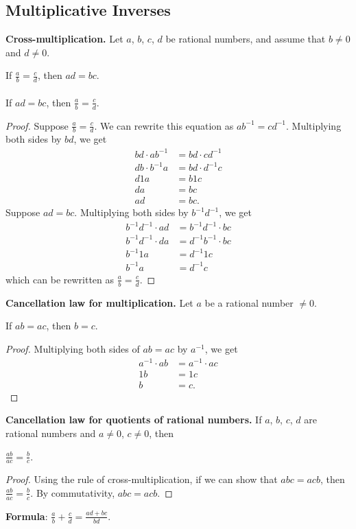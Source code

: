 \documentclass[12pt]{article}
\begin{document}
\subsection{Multiplicative Inverses}
\textbf{Cross-multiplication.} Let $a$, $b$, $c$, $d$ be rational numbers, and assume that $b\neq0$ and $d\neq0$.
\begin{center}
If $\displaystyle \frac{a}{b}=\displaystyle \frac{c}{d}$, then $ad=bc$. \\
~ \\
If $ad=bc$, then $\displaystyle \frac{a}{b}=\displaystyle \frac{c}{d}$.
\end{center}
\begin{proof}
Suppose $\displaystyle \frac{a}{b}=\displaystyle \frac{c}{d}$. We can rewrite this equation as $ab^{-1}=cd^{-1}$. Multiplying both sides by $bd$, we get
\begin{align*}
bd\cdot ab^{-1}&=bd\cdot cd^{-1} \\
db\cdot b^{-1}a&=bd\cdot d^{-1}c \\
d1a&=b1c \\
da&=bc \\
ad&=bc.
\end{align*}
Suppose $ad=bc$. Multiplying both sides by $b^{-1}d^{-1}$, we get
\begin{align*}
b^{-1}d^{-1}\cdot ad&=b^{-1}d^{-1}\cdot bc \\
b^{-1}d^{-1}\cdot da&=d^{-1}b^{-1}\cdot bc \\
b^{-1}1a&=d^{-1}1c \\
b^{-1}a&=d^{-1}c
\end{align*}
which can be rewritten as $\displaystyle \frac{a}{b}=\displaystyle \frac{c}{d}$.
\end{proof}
\textbf{Cancellation law for multiplication.} Let $a$ be a rational number $\neq0$.
\begin{center}
If $ab=ac$, then $b=c$.
\end{center}
\begin{proof}
Multiplying both sides of $ab=ac$ by $a^{-1}$, we get
\begin{align*}
a^{-1}\cdot ab&=a^{-1}\cdot ac \\
1b&=1c \\
b&=c.
\end{align*}
\end{proof}
\textbf{Cancellation law for quotients of rational numbers.} If $a$, $b$, $c$, $d$ are rational numbers and $a\neq0$, $c\neq0$, then
\begin{center}
$\displaystyle \frac{ab}{ac}=\displaystyle \frac{b}{c}$.
\end{center}
\begin{proof}
Using the rule of cross-multiplication, if we can show that $abc=acb$, then $\displaystyle \frac{ab}{ac}=\displaystyle \frac{b}{c}$. By commutativity, $abc=acb$.
\end{proof}
\textbf{Formula}: $\displaystyle \frac{a}{b}+\displaystyle \frac{c}{d}=\displaystyle \frac{ad+bc}{bd}.$
\end{document}
